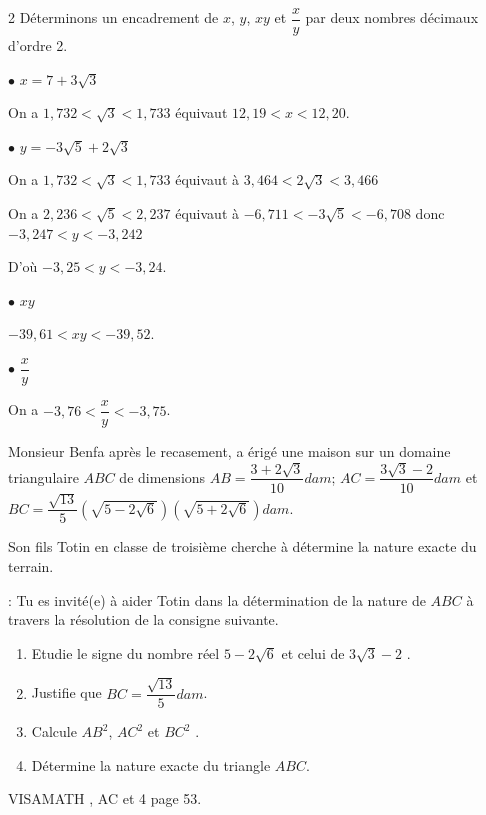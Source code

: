 \begin{multicols*}{2}
  	\dure
  	\resul
  	Déterminons un encadrement de $x$, $y$, $xy$ et $\dfrac{x}{y}$   par deux nombres décimaux d'ordre 2.
  	
  	$\bullet$ $x=7+3\sqrt{3}$ 
  	
  	On a $1,732< \sqrt{3} <1,733$ équivaut $12,19< x <12,20$.
  	
  	$\bullet$ $ y=-3\sqrt{5}+2\sqrt{3}$
  	
  	On a $1,732< \sqrt{3} <1,733$ équivaut à $3,464< 2\sqrt{3} <3,466$
  	
  	On a $2,236 <\sqrt{5} <2,237$ équivaut à $-6,711 <-3\sqrt{5} <-6,708$ donc $-3,247< y <-3,242$
  	
  	D'où $-3,25< y <-3,24$.
  	
  	$\bullet$ $xy$
  	
  	$-39,61< xy <-39,52$.
  	
  	$\bullet$  $\dfrac{x}{y}$
  	
  	On a $-3,76< \dfrac{x}{y} <-3,75$.
  	
  	\begin{center}
  	\end{center}
  	\begin{center}
  	\end{center}
  	Monsieur Benfa après le recasement, a érigé une maison sur un domaine triangulaire $ABC$ de dimensions $AB=\dfrac{3+2\sqrt{3}}{10} dam$; $AC=\dfrac{3\sqrt{3}-2}{10}dam$ et $BC=\dfrac{\sqrt{13}}{5}\left(\sqrt{5-2\sqrt{6}} \right)\left(\sqrt{5+2\sqrt{6}} \right)dam$.
  	
  	Son fils Totin en classe de troisième cherche à détermine la nature exacte du terrain.
  	
  	
  	: Tu es invité(e) à aider Totin dans la détermination de la nature de $ABC$ à travers la résolution de la consigne suivante.
  	\begin{enumerate}
  		\item Etudie le signe du nombre réel  $5-2\sqrt{6}$ et celui de $3\sqrt{3}-2$  .
  		\item Justifie que  $BC=\dfrac{\sqrt{13}}{5}dam$.
  		\item Calcule $AB^2$, $AC^2$ et $BC^2$ .
  		\item Détermine la nature exacte du triangle $ABC$.
  	\end{enumerate} 
  	\begin{center}
  	\end{center}
  	VISAMATH , AC  et 4 page 53.
  	
  	\doc
  \end{multicols*}
